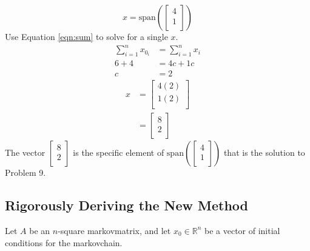 \documentclass[titlepage]{article}
\newcommand{\spn}[1]{\text{span}\left( #1 \right)}
\newcommand{\R}{\mathbb{R}}
\begin{document}
\begin{equation*}
    x = \spn{
        \begin{bmatrix}
            4\\
            1\\
        \end{bmatrix}
    }
\end{equation*}
Use Equation \ref{eqn:sum} to solve for a single $x$.
\begin{align*}
    \sum_{i=1}^n x_{0_i} &= \sum_{i=1}^n x_i\\
    6+4 &= 4c+1c\\
    c &= 2
\end{align*}
\begin{align*}
    x &=
    \begin{bmatrix}
        4(2)\\
        1(2)\\
    \end{bmatrix}\\
    &=
    \begin{bmatrix}
        8\\
        2\\
    \end{bmatrix}
\end{align*}
The vector $
    \begin{bmatrix}
        8\\
        2\\
    \end{bmatrix}
$ is the specific element of $
    \spn{
        \begin{bmatrix}
            4\\
            1\\
        \end{bmatrix}
    }
$ that is the solution to Problem 9.


\subsection{Rigorously Deriving the New Method}\label{sss:rigorous}
Let $A$ be an $n$-square \Gls{markovmatrix}, and let $x_0\in\R^n$ be a vector of initial conditions for the \Gls{markovchain}.
\end{document}
